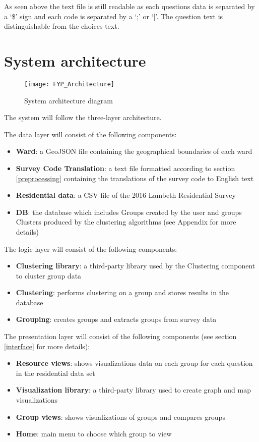 As  seen above the text file is still readable as each question\textquotesingle s data is separated by a `\$' sign and each code is separated by a `;' or `|'. The question text is distinguishable from the choices text.

\section{System architecture}

\begin{figure}[h]
\centering
\texttt{[image: FYP\_Architecture]}
\caption{System architecture diagram}
\end{figure}

The system will follow the three-layer architecture. \par
The data layer will consist of the following components:
\begin{itemize}
  \item \textbf{Ward}: a GeoJSON file containing the geographical boundaries of each ward
  \item \textbf{Survey Code Translation}: a text file formatted according to section \ref{preprocessing} containing the translations of the survey code to English text
  \item \textbf{Residential data}: a CSV file of the 2016 Lambeth Residential Survey
  \item \textbf{DB}: the database which includes Groups created by the user and groups\textsc{} Clusters produced by the clustering algorithms (see  Appendix for more details)
\end{itemize}

The logic layer will consist of the following components:
\begin{itemize}
  \item \textbf{Clustering library}: a third-party library used by the Clustering component to cluster group data
  \item \textbf{Clustering}: performs clustering on a group and stores results in the database
  \item \textbf{Grouping}: creates groups and extracts groups from survey data
\end{itemize}

The presentation layer will consist of the following components (see section \ref{interface} for more details):
\begin{itemize}
  \item \textbf{Resource views}: shows visualizations data on each group for each question in the residential data set
  \item \textbf{Visualization library}: a third-party library used to create graph and map visualizations
  \item \textbf{Group views}: shows visualizations of groups and compares groups
  \item \textbf{Home}: main menu to choose which group to view
\end{itemize}

